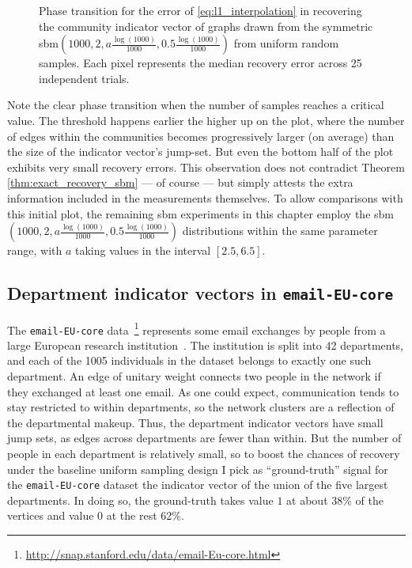 \begin{figure}[ht]
    \centering
    \hfill
    \caption[Phase transition of the recovery error in 2-\texttt{SSBM}(500~+~500) graphs]{Phase transition for the error of \eqref{eq:l1_interpolation} in recovering the community indicator vector of graphs drawn from the symmetric \acrshort{sbm}$\left(1000, 2, a \frac{\log (1000)}{1000}, 0.5 \frac{\log (1000)}{1000}\right)$ from uniform random samples. Each pixel represents the median recovery error across 25 independent trials.}
    \label{fig:pt_2ssbm_unif_samp_tv_interp_with_thresholds}
\end{figure}

Note the clear phase transition when the number of samples reaches a critical value. The threshold happens earlier the higher up on the plot, where the number of edges within the communities becomes progressively larger (on average) than the size of the indicator vector's jump-set. But even the bottom half of the plot exhibits very small recovery errors. This observation does not contradict Theorem \ref{thm:exact_recovery_sbm} --- of course --- but simply attests the extra information included in the measurements themselves. To allow comparisons with this initial plot, the remaining \acrshort{sbm} experiments in this chapter employ the \acrshort{sbm}$\left(1000, 2, a \frac{\log (1000)}{1000}, 0.5 \frac{\log (1000)}{1000}\right)$ distributions within the same parameter range, \ie with $a$ taking values in the interval $[2.5, 6.5]$.

\subsection{Department indicator vectors in \texttt{email-EU-core}}

The \texttt{email-EU-core} data~\footnote{\url{http://snap.stanford.edu/data/email-Eu-core.html}} represents some email exchanges by people from a large European research institution~\cite{yin2017}. The institution is split into 42 departments, and each of the 1005 individuals in the dataset belongs to exactly one such department. An edge of unitary weight connects two people in the network if they exchanged at least one email. As one could expect, communication tends to stay restricted to within departments, so the network clusters are a reflection of the departmental makeup. Thus, the department indicator vectors have small jump sets, as edges across departments are fewer than within. But the number of people in each department is relatively small, so to boost the chances of recovery under the baseline uniform sampling design I pick as ``ground-truth'' signal for the \texttt{email-EU-core} dataset the indicator vector of the union of the five largest departments. In doing so, the ground-truth takes value $1$ at about 38\% of the vertices and value $0$ at the rest 62\%.

